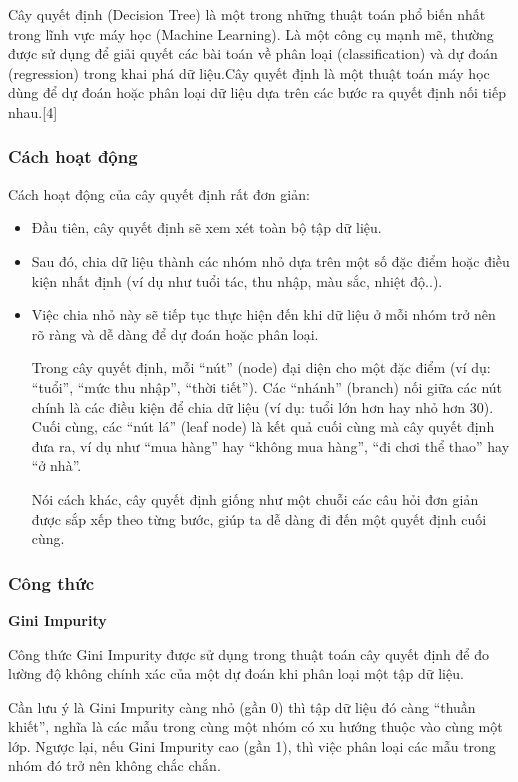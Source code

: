 \documentclass[
]{article}
\begin{document}
Cây quyết định (Decision Tree) là một trong những thuật toán phổ biến
nhất trong lĩnh vực máy học (Machine Learning). Là một công cụ mạnh mẽ,
thường được sử dụng để giải quyết các bài toán về phân loại
(classification) và dự đoán (regression) trong khai phá dữ liệu.Cây
quyết định là một thuật toán máy học dùng để dự đoán hoặc phân loại dữ
liệu dựa trên các bước ra quyết định nối tiếp nhau.{[}4{]}

\subsubsection{Cách hoạt động}\label{cuxe1ch-houx1ea1t-ux111ux1ed9ng-1}

Cách hoạt động của cây quyết định rất đơn giản:

\begin{itemize}
\item
  Đầu tiên, cây quyết định sẽ xem xét toàn bộ tập dữ liệu.
\item
  Sau đó, chia dữ liệu thành các nhóm nhỏ dựa trên một số đặc điểm hoặc
  điều kiện nhất định (ví dụ như tuổi tác, thu nhập, màu sắc, nhiệt
  độ..).
\item
  Việc chia nhỏ này sẽ tiếp tục thực hiện đến khi dữ liệu ở mỗi nhóm trở
  nên rõ ràng và dễ dàng để dự đoán hoặc phân loại.

  Trong cây quyết định, mỗi ``nút'' (node) đại diện cho một đặc điểm (ví
  dụ: ``tuổi'', ``mức thu nhập'', ``thời tiết''). Các ``nhánh'' (branch)
  nối giữa các nút chính là các điều kiện để chia dữ liệu (ví dụ: tuổi
  lớn hơn hay nhỏ hơn 30). Cuối cùng, các ``nút lá'' (leaf node) là kết
  quả cuối cùng mà cây quyết định đưa ra, ví dụ như ``mua hàng'' hay
  ``không mua hàng'', ``đi chơi thể thao'' hay ``ở nhà''.

  Nói cách khác, cây quyết định giống như một chuỗi các câu hỏi đơn giản
  được sắp xếp theo từng bước, giúp ta dễ dàng đi đến một quyết định
  cuối cùng.
\end{itemize}

\subsubsection{Công thức}\label{cuxf4ng-thux1ee9c}

\textbf{Gini Impurity}

Công thức Gini Impurity được sử dụng trong thuật toán cây quyết định để
đo lường độ không chính xác của một dự đoán khi phân loại một tập dữ
liệu.

Cần lưu ý là Gini Impurity càng nhỏ (gần 0) thì tập dữ liệu đó càng
``thuần khiết'', nghĩa là các mẫu trong cùng một nhóm có xu hướng thuộc
vào cùng một lớp. Ngược lại, nếu Gini Impurity cao (gần 1), thì việc
phân loại các mẫu trong nhóm đó trở nên không chắc chắn.
\end{document}
